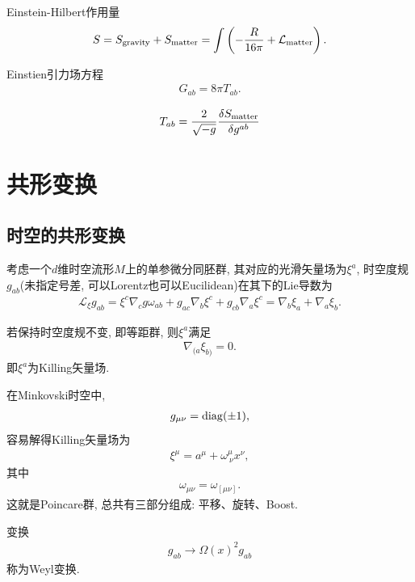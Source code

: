Einstein-Hilbert作用量
\begin{align}
    S=S_{\rm{gravity}}+S_{\rm{matter}}=\int\left(-\frac{R}{16\pi}+\mathcal L_{\rm{matter}}\right).
\end{align}

Einstien引力场方程
\begin{align}
    G_{ab}=8\pi T_{ab}.
\end{align}
\begin{theorem}[物质场能动张量]\label{stress-tensor}
    \begin{align}
        T_{ab}=\frac{2}{\sqrt{-g}}\frac{\delta S_{\rm{matter}}}{\delta g^{ab}}
    \end{align}
\end{theorem}

\newpage
\section{共形变换}
\subsection{时空的共形变换}
考虑一个$d$维时空流形$M$上的单参微分同胚群, 其对应的光滑矢量场为$\xi^a$, 时空度规$g_{ab}$(未指定号差, 可以Lorentz也可以Eucilidean)在其下的Lie导数为
\begin{align}
    \mathscr L_\xi g_{ab}=\xi^c\nabla_c g\omega_{ab}+g_{ac}\nabla_b\xi^c+g_{cb}\nabla_a\xi^c=\nabla_b\xi_a+\nabla_a\xi_b.
\end{align}

若保持时空度规不变, 即等距群, 则$\xi^a$满足
\begin{align}
    \nabla_{(a}\xi_{b)}=0.
\end{align}
即$\xi^a$为Killing矢量场.

在Minkovski时空中, 
\begin{align}
    g_{\mu\nu}=\rm{diag}(\pm1), 
\end{align}
容易解得Killing矢量场为
\begin{align}
    \xi^\mu=a^\mu+\omega^\mu_{~\nu}x^\nu,
\end{align}
其中
\begin{align}
    \omega_{\mu\nu}=\omega_{[\mu\nu]}.
\end{align}
这就是Poincare群, 总共有三部分组成: 平移、旋转、Boost.

\begin{definition}[Weyl变换]
    变换
    \begin{align}
        g_{ab}\to \Omega(x)^2g_{ab}
    \end{align}
    称为Weyl变换.
\end{definition}

